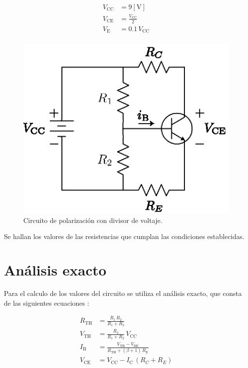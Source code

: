 \documentclass[letter,twoside,11pt]{article}
\begin{document}
\begin{equation*}
    \begin{split}
        V_{\text{CC}} &= 9[\text{V}]\\
        V_{\text{CE}} &= \frac{V_{\text{CC}}}{2}\\
        V_{\text{E}} &= 0.1\,V_{\text{CC}}\\
    \end{split}
\end{equation*}

\begin{figure}[!h]
\centering
\includegraphics[scale=1.1]{figura1.eps}
\caption{Circuito de polarización con divisor de voltaje.}
\label{circuito1}
\end{figure}

Se hallan los valores de las resistencias que cumplan las condiciones
establecidas.

\section{Análisis exacto}
Para el calculo de los valores del circuito se utiliza el análisis exacto, que
consta de las siguientes ecuaciones \cite{Boylestad}:

\begin{equation*}
    \begin{split}
        R_{\text{TH}} &= \frac{R_1\,R_2}{R_1+R_2}\\
        V_{\text{TH}} &= \frac{R_2}{R_1+R_2}\,V_{\text{CC}}\\
        I_{\text{B}}  &= \frac{V_{\text{TH}}-V_{\text{BE}}}
                         {R_{\text{TH}}+(\beta + 1)\,R_{\text{E}}}\\
        V_{\text{CE}} &= V_{\text{CC}} - I_{\text{C}}\,(R_C + R_E)\\
    \end{split}
\end{equation*}
\end{document}
